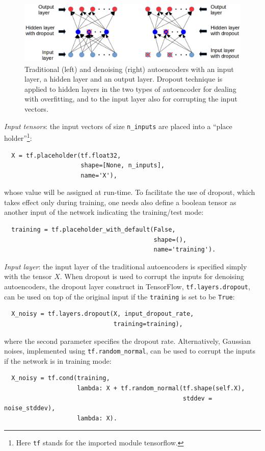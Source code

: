 \documentclass[12pt]{article}
\begin{document}
\begin{figure}
  \includegraphics[width=0.9\linewidth]{figures/autoencoders.eps}
  \caption{Traditional (left) and denoising (right) autoencoders with an input layer, a hidden layer and an output layer. Dropout technique is applied to hidden layers in the two types of autoencoder for dealing with overfitting, and to the input layer also for corrupting the input vectors.}
  \label{fig:autoencoders}
\end{figure}

\textit{Input tensors}: the input vectors of size \texttt{n\_inputs} are placed into a ``place holder''\footnote{Here \texttt{tf} stands for the imported module tensorflow.}:
\begin{verbatim}
  X = tf.placeholder(tf.float32,
                     shape=[None, n_inputs],
                     name='X'),
\end{verbatim}
\noindent
whose value will be assigned at run-time. To facilitate the use of dropout, which takes effect only during training, one needs also define a boolean tensor as another input of the network indicating the training/test mode:
\begin{verbatim}
  training = tf.placeholder_with_default(False, 
                                         shape=(), 
                                         name='training').
\end{verbatim}

\textit{Input layer}: the input layer of the traditional autoencoders is specified simply with the tensor $X$. When dropout is used to corrupt the inputs for denoising autoencoders, the dropout layer construct in TensorFlow, \texttt{tf.layers.dropout}, can be used on top of the original input if the \texttt{training} is set to be \texttt{True}:
\begin{verbatim}
  X_noisy = tf.layers.dropout(X, input_dropout_rate, 
                              training=training),
\end{verbatim}
\noindent
where the second parameter specifies the dropout rate. Alternatively, Gaussian noises, implemented using \texttt{tf.random\_normal}, can be used to corrupt the inputs if the network is in training mode:
\begin{verbatim}
  X_noisy = tf.cond(training,
                    lambda: X + tf.random_normal(tf.shape(self.X), 
                                                 stddev = noise_stddev),
                    lambda: X).
\end{verbatim}
\end{document}
